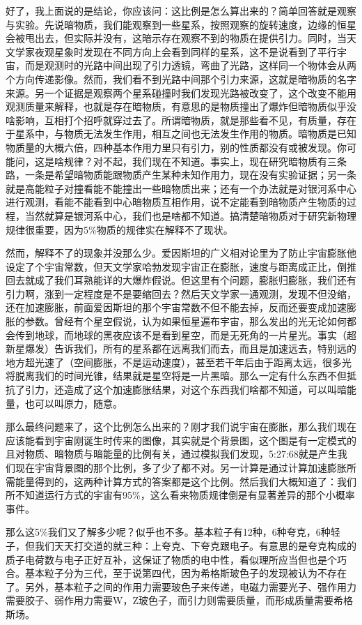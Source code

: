 \documentclass[
]{book}
\begin{document}
好了，我上面说的是结论，你应该问：这比例是怎么算出来的？简单回答就是观察与实验。先说暗物质，我们能观察到一些星系，按照观察的旋转速度，边缘的恒星会被甩出去，但实际并没有，这暗示存在观察不到的物质在提供引力。同时，当天文学家夜观星象时发现在不同方向上会看到同样的星系，这不是说看到了平行宇宙，而是观测时的光路中间出现了引力透镜，弯曲了光路，这样同一个物体会从两个方向传递影像。然而，我们看不到光路中间那个引力来源，这就是暗物质的名字来源。另一个证据是观察两个星系碰撞时我们发现光路被改变了，这个改变不能用观测质量来解释，也就是存在暗物质，有意思的是物质撞出了爆炸但暗物质似乎没啥影响，互相打个招呼就穿过去了。所谓暗物质，就是那些看不见，有质量，存在于星系中，与物质无法发生作用，相互之间也无法发生作用的物质。暗物质是已知物质量的大概六倍，四种基本作用力里只有引力，别的性质都没有或被发现。你可能问，这是啥规律？对不起，我们现在不知道。事实上，现在研究暗物质有三条路，一条是希望暗物质能跟物质产生某种未知作用力，现在没有实验证据；另一条就是高能粒子对撞看能不能撞出一些暗物质出来；还有一个办法就是对银河系中心进行观测，看能不能看到中心暗物质互相作用，说不定能看到暗物质产生物质的过程，当然就算是银河系中心，我们也是啥都不知道。搞清楚暗物质对于研究新物理规律很重要，因为5\%物质的规律实在解释不了现状。

然而，解释不了的现象并没那么少。爱因斯坦的广义相对论里为了防止宇宙膨胀他设定了个宇宙常数，但天文学家哈勃发现宇宙正在膨胀，速度与距离成正比，倒推回去就成了我们耳熟能详的大爆炸假说。但这里有个问题，膨胀归膨胀，我们还有引力啊，涨到一定程度是不是要缩回去？然后天文学家一通观测，发现不但没缩，还在加速膨胀，前面爱因斯坦的那个宇宙常数不但不能去掉，反而还要变成加速膨胀的参数。曾经有个星空假说，认为如果恒星遍布宇宙，那么发出的光无论如何都会传到地球，而地球的黑夜应该不是看到星空，而是无死角的一片星光。事实（超新星爆发）告诉我们，所有的星系都在远离我们而去，而且是加速远去，特别远的地方超光速了（空间膨胀，不是运动速度），甚至若干年后由于距离太远，很多光将脱离我们的时间光锥，结果就是星空将是一片黑暗。那么一定有什么东西不但抵抗了引力，还造成了这个加速膨胀结果，对这个东西我们啥都不知道，可以叫暗能量，也可以叫原力，随意。

那么最终问题来了，这个比例怎么出来的？刚才我们说宇宙在膨胀，那么我们现在应该能看到宇宙刚诞生时传来的图像，其实就是个背景图，这个图是有一定模式的且对物质、暗物质与暗能量的比例有关，通过模拟我们发现，5:27:68就是产生我们现在宇宙背景图的那个比例，多了少了都不对。另一计算是通过计算加速膨胀所需能量得到的，这两种计算方式的答案都是这个比例。然后我们大概知道了：我们所不知道运行方式的宇宙有95\%，这么看来物质规律倒是有显著差异的那个小概率事件。

那么这5\%我们又了解多少呢？似乎也不多。基本粒子有12种，6种夸克，6种轻子，但我们天天打交道的就三种：上夸克、下夸克跟电子。有意思的是夸克构成的质子电荷数与电子正好互补，这保证了物质的电中性，看似理所应当但也是个巧合。基本粒子分为三代，至于说第四代，因为希格斯玻色子的发现被认为不存在了。另外，基本粒子之间的作用力需要玻色子来传递，电磁力需要光子、强作用力需要胶子、弱作用力需要W，Z玻色子，而引力则需要质量，而形成质量需要希格斯场。
\end{document}
